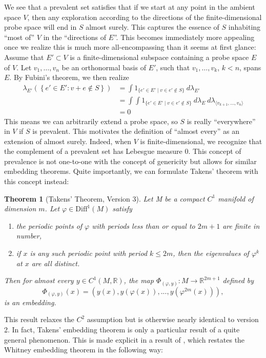 \documentclass[11pt, a4paper]{memoir}
\theoremstyle{break}
\newtheorem{thm}{Theorem}
\theoremstyle{break}
\theoremstyle{nonumberplain}
\newcommand{\mR}{\mathbb{R}}
\begin{document}
We see that a prevalent set satisfies that if we start at any point in the ambient space $V$, then any exploration according to the directions of the finite-dimensional probe space will end in $S$ almost surely. This captures the essence of $S$ inhabiting \enquote{most of} $V$ in the \enquote{directions of $E$}. This becomes immediately more appealing once we realize this is much more all-encompassing than it seems at first glance: Assume that $E'\subset V$ is a finite-dimensional subspace containing a probe space $E$ of $V$. Let $v_1,\ldots,v_n$ be an orthonormal basis of $E'$, such that $v_1,\ldots,v_k$, $k<n$, spans $E$. By Fubini's theorem, we then realize
\begin{align*}
\lambda_{E'}\left(\left\{e'\in E':v+e\not\in S\right\}\right)&=\int 1_{\{e'\in E'\mid v\in e'\notin S\}}\ d\lambda_{E'}\\
&=\int\int 1_{\{e'\in E'\mid  v\in e'\notin S\}}\ d\lambda_{E}\ d\lambda_{\langle v_{k+1},\ldots, v_n \rangle}\\
&=0
\end{align*}
This means we can arbitrarily extend a probe space, so $S$ is really \enquote{everywhere} in $V$ if $S$ is prevalent. This motivates the definition of \enquote{almost every} as an extension of almost surely. Indeed, when $V$ is finite-dimensional, we recognize that the complement of a prevalent set has Lebesgue measure 0. This concept of prevalence is not one-to-one with the concept of genericity but allows for similar embedding theorems. Quite importantly, we can formulate Takens' theorem with this concept instead:
\begin{thm}[Takens' Theorem, Version 3]
Let M be a compact $C^1$ manifold of dimension $m$. Let $\varphi\in\text{Diff}^1(M)$ satisfy
\begin{enumerate}[label=(\roman*)]
	\item the periodic points of $\varphi$ with periods less than or equal to $2m+1$ are finite in number,
	\item if $x$ is any such periodic point with period $k\leqslant 2m$, then the eigenvalues of $\varphi^k$ at $x$ are all distinct.
\end{enumerate}
 Then for almost every $y\in C^1(M,\mR)$, the map $\Phi_{(\varphi,y)}:M\to \mathbb{R}^{2m+1}$ defined by
$$\Phi_{(\varphi,y)}(x)=(y(x),y(\varphi(x)),...,y(\varphi^{2m}(x))),$$
is an embedding. \cite{Sauer1991}
\end{thm}
This result relaxes the $C^2$ assumption but is otherwise nearly identical to version 2. In fact, Takens' embedding theorem is only a particular result of a quite general phenomenon. This is made explicit in a result of \cite{Sauer1991}, which restates the Whitney embedding theorem in the following way:
\end{document}
